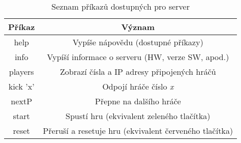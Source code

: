 \begin{table}[hbtp]
  \centering
\caption{\label{tab:server_prikazy} Seznam příkazů dostupných pro server}
\begin{tabular}{|c|c|}
\hline
\textbf{Příkaz} & \textbf{Význam}                                        \\ \hline
help            & Vypíše nápovědu (dostupné příkazy)                     \\ \hline
info            & Vypíší informace o serveru (HW, verze SW, apod.)       \\ \hline
players         & Zobrazí čísla a IP adresy připojených hráčů            \\ \hline
kick 'x'        & Odpojí hráče číslo \textit{x}                          \\ \hline
nextP           & Přepne na dalšího hráče                                \\ \hline
start           & Spustí hru (ekvivalent zeleného tlačítka)              \\ \hline
reset           & Přeruší a resetuje hru (ekvivalent červeného tlačítka) \\ \hline
\end{tabular}
\end{table}
